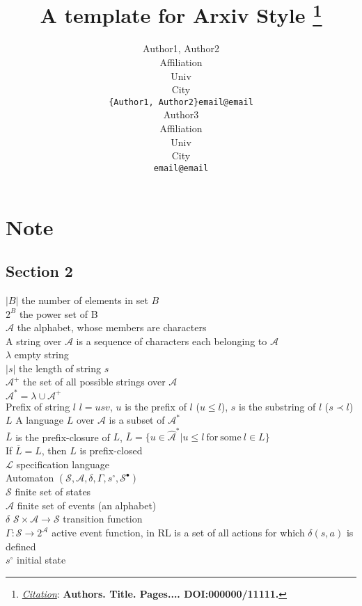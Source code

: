 \documentclass{article}
\title{A template for Arxiv Style
\thanks{\textit{\underline{Citation}}: 
\textbf{Authors. Title. Pages.... DOI:000000/11111.}} 
}
\author{
  Author1, Author2 \\
  Affiliation \\
  Univ \\
  City\\
  \texttt{\{Author1, Author2\}email@email} \\
   \And
  Author3 \\
  Affiliation \\
  Univ \\
  City\\
  \texttt{email@email} \\
}
\begin{document}
\maketitle


\section{Note}
\subsection{Section 2}
$|B|$ \quad the number of elements in set $B$\\
$2^B$ \quad the power set of B \\
$\mathcal{A}$ \quad the alphabet, whose members are characters\\
A string over $\mathcal{A}$ is a sequence of characters each belonging to $\mathcal{A}$\\
$\lambda$ \quad empty string\\
$|s|$ \quad the length of string $s$\\
$\mathcal{A}^{+}$ \quad the set of all possible strings over $\mathcal{A}$\\
$\mathcal{A}^{*} = \lambda \cup \mathcal{A}^{+}$\\
Prefix of string $l$ \quad $l=usv$, $u$ is the prefix of $l$ ($u \leq l$), $s$ is the substring of $l$ ($s\prec l$)\\
$L$ \quad A language $L$ over $\mathcal{A}$ is a subset of $\mathcal{A}^{*}$\\
$\overline{L}$ is the prefix-closure of $L$, $\overline{L}=\{u\in\hat{\mathcal{A}}^{*}|u\leq l \  \mathrm{for} \  \mathrm{some} \   l \in L\}$\\
If $\overline{L}=L$, then $L$ is prefix-closed\\
$\mathcal{L}$ \quad specification language\\
Automaton \quad $(\mathcal{S},\mathcal{A},\delta,\Gamma,s^{\circ},\mathcal{S}^{\bullet})$\\
$\mathcal{S}$ \quad finite set of states\\
$\mathcal{A}$ \quad finite set of events (an alphabet)\\
$\delta$ \quad $\mathcal{S}\times\mathcal{A}\rightarrow\mathcal{S}$ transition function\\
$\Gamma:\mathcal{S}\rightarrow2^{\mathcal{A}}$ \quad active event function, in RL is a set of all actions for which $\delta(s,a)$ is defined\\
$s^{\circ}$ \quad initial state\\
\end{document}
